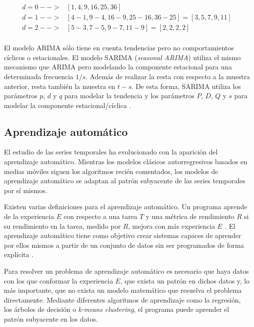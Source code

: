 
\begin{align*}
	d=0 -->& [1, 4, 9, 16, 25, 36]\\
	d=1 -->& [4-1, 9-4, 16-9, 25-16, 36-25] = [3, 5, 7, 9, 11]\\
	d=2 -->& [5-3, 7-5, 9-7, 11-9] = [2, 2, 2, 2]\\
\end{align*}

El modelo ARIMA sólo tiene en cuenta tendencias pero no comportamientos cíclicos o estacionales. El modelo SARIMA (\textit{seasonal ARIMA}) utiliza el mismo mecanismo que ARIMA pero modelando la componente estacional para una determinada frecuencia $1/s$. Además de realizar la resta con respecto a la muestra anterior, resta también la muestra en $t-s$. De esta forma, SARIMA utiliza los parámetros $p$, $d$ y $q$ para modelar la tendencia y los parámetros $P$, $D$, $Q$ y $s$ para modelar la componente estacional/cíclica \cite{machinelearningbook, sarima1}.



\subsection{Aprendizaje automático}
El estudio de las series temporales ha evolucionado con la aparición del aprendizaje automático. Mientras los modelos clásicos autorregresivos basados en medias móviles siguen los algoritmos recién comentados, los modelos de aprendizaje automático se adaptan al patrón subyacente de las series temporales por sí mismos.

Existen varias definiciones para el aprendizaje automático. Un programa aprende de la experiencia $E$ con respecto a una tarea $T$ y una métrica de rendimiento $R$ si su rendimiento en la tarea, medido por $R$, mejora con más experiencia $E$ \cite{mitchell1997}. El aprendizaje automático tiene como objetivo crear sistemas capaces de aprender por ellos mismos a partir de un conjunto de datos sin ser programados de forma explícita \cite{samuel1959}.

Para resolver un problema de aprendizaje automático es necesario que haya datos con los que conformar la experiencia $E$, que exista un patrón en dichos datos y, lo más importante, que no exista un modelo matemático que resuelva el problema directamente. Mediante diferentes algoritmos de aprendizaje como la regresión, los árboles de decisión o \textit{k-means clustering}, el programa puede aprender el patrón subyacente en los datos.

